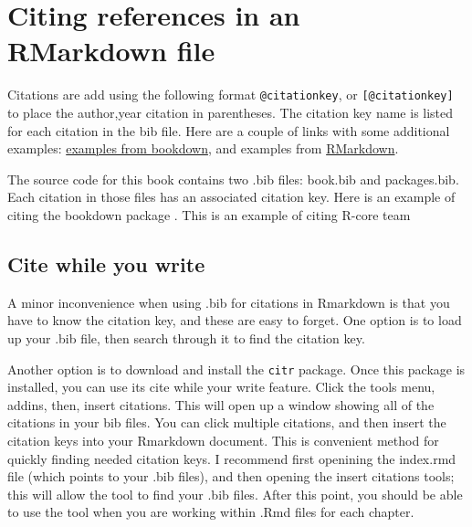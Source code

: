 \documentclass[]{book}
\theoremstyle{definition}
\theoremstyle{definition}
\theoremstyle{definition}
\theoremstyle{remark}
\begin{document}
\section{Citing references in an RMarkdown
file}\label{citing-references-in-an-rmarkdown-file}

Citations are add using the following format \texttt{@citationkey}, or
\texttt{{[}@citationkey{]}} to place the author,year citation in
parentheses. The citation key name is listed for each citation in the
bib file. Here are a couple of links with some additional examples:
\href{https://bookdown.org/yihui/bookdown/citations.html}{examples from
bookdown}, and examples from
\href{http://rmarkdown.rstudio.com/authoring_bibliographies_and_citations.html}{RMarkdown}.

The source code for this book contains two .bib files: book.bib and
packages.bib. Each citation in those files has an associated citation
key. Here is an example of citing the bookdown package \citep{xie2015}.
This is an example of citing R-core team \citep{R-base}

\subsection{Cite while you write}\label{cite-while-you-write}

A minor inconvenience when using .bib for citations in Rmarkdown is that
you have to know the citation key, and these are easy to forget. One
option is to load up your .bib file, then search through it to find the
citation key.

Another option is to download and install the \texttt{citr} package.
Once this package is installed, you can use its cite while your write
feature. Click the tools menu, addins, then, insert citations. This will
open up a window showing all of the citations in your bib files. You can
click multiple citations, and then insert the citation keys into your
Rmarkdown document. This is convenient method for quickly finding needed
citation keys. I recommend first openining the index.rmd file (which
points to your .bib files), and then opening the insert citations tools;
this will allow the tool to find your .bib files. After this point, you
should be able to use the tool when you are working within .Rmd files
for each chapter.


\end{document}
